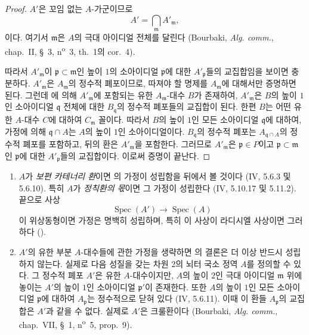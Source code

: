 \begin{proof}
$A'$은 꼬임 없는 $A$-가군이므로
\[
  A'=\bigcap_{\mathfrak m}A'_{\mathfrak m},
\]
이다. 여기서 $\mathfrak m$은 $A$의 극대 아이디얼 전체를 달린다
(Bourbaki, \emph{Alg. comm.}, chap.~II, §~3,
n\textsuperscript{o}~3, th.~1의 cor.~4).


따라서 $A'_{\mathfrak m}$이 $\mathfrak p\subset\mathfrak m$인 높이
$1$의 소아이디얼 $\mathfrak p$에 대한 $A'_{\mathfrak p}$들의
교집합임을 보이면 충분하다. $A'_{\mathfrak m}$은
$A_{\mathfrak m}$의 정수적 폐포이므로, 따져야 할 명제를
$A_{\mathfrak m}$에 대해서만 증명하면 된다. 그런데
에 의해 $A'_{\mathfrak m}$에 포함되는 유한
$A_{\mathfrak m}$-대수 $B$가 존재하여, $A'_{\mathfrak m}$은 $B$의
높이 $1$인 소아이디얼 $\mathfrak q$ 전체에 대한
$B_{\mathfrak q}$의 정수적 폐포들의 교집합이 된다. 한편 $B$는 어떤
유한 $A$-대수 $C$에 대하여 $C_{\mathfrak m}$ 꼴이다. 따라서 $B$의
높이 $1$인 모든 소아이디얼 $\mathfrak q$에 대하여, 가정에 의해
$\mathfrak q\cap A$는 $A$의 높이 $1$인 소아이디얼이다.
$B_{\mathfrak q}$의 정수적 폐포는
$A_{\mathfrak q\cap A}$의 정수적 폐포를 포함하고, 뒤의 환은
$A'_{\mathfrak m}$을 포함한다. 그러므로 $A'_{\mathfrak m}$은
$\mathfrak p\in P$이고 $\mathfrak p\subset\mathfrak m$인
$\mathfrak p$에 대한 $A'_{\mathfrak p}$들의 교집합이다. 이로써
증명이 끝난다.
\end{proof}

\begin{remarks}[23.2.10]
\label{0.23.2.10-ko}
\begin{enumerate}
  \item[(i)] $A$가 \emph{보편 카테너리 환}이면
  의 가정이 성립함을 뒤에서 볼 것이다
  (IV, 5.6.3 및 5.6.10). 특히 $A$가 \emph{정칙환의 몫}이면 그
  가정이 성립한다 (IV, 5.10.17 및 5.11.2). 끝으로 사상
  \[
    \operatorname{Spec}(A')\longrightarrow\operatorname{Spec}(A)
  \]
  이 위상동형이면 가정은 명백히 성립하며, 특히 이 사상이 라디시엘
  사상이면 그러하다 ().

  \item[(ii)] $A'$의 유한 부분 $A$-대수들에 관한 가정을 생략하면
  의 결론은 더 이상 반드시 성립하지 않는다.
  실제로 다음 성질을 갖는 차원 $2$의 뇌터 국소 정역 $A$를 정의할
  수 있다. 그 정수적 폐포 $A'$은 유한 $A$-대수이지만, $A$의 높이
  $2$인 극대 아이디얼 $\mathfrak m$ 위에 놓이는 $A'$의 높이 $1$인
  소아이디얼 $\mathfrak p'$이 존재한다. 또한 $A$의 높이 $1$인 모든
  소아이디얼 $\mathfrak p$에 대하여 $A_{\mathfrak p}$는 정수적으로
  닫혀 있다 (IV, 5.6.11). 이때 이 환들 $A_{\mathfrak p}$의
  교집합은 $A'$과 같을 수 없다. 실제로 $A'$은 크룰환이다
  (Bourbaki, \emph{Alg. comm.}, chap.~VII, §~1,
  n\textsuperscript{o}~5, prop.~9).
\end{enumerate}
\end{remarks}

